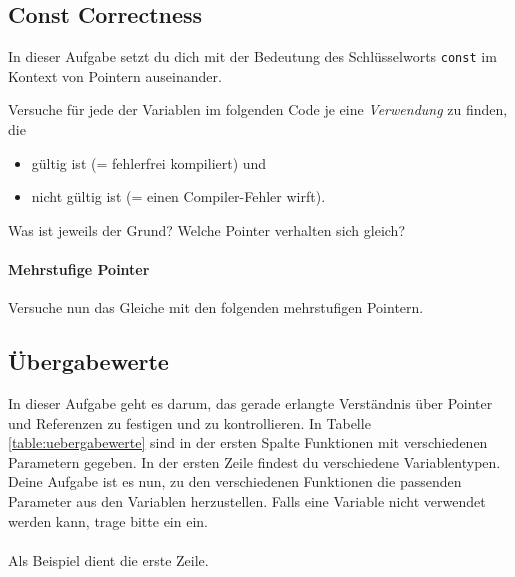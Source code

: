 \subsection{Const Correctness}

In dieser Aufgabe setzt du dich mit der Bedeutung des Schlüsselworts \lstinline{const} im Kontext von Pointern auseinander.

Versuche für jede der Variablen im folgenden Code je eine \emph{Verwendung} zu finden, die  
\begin{itemize}
\item gültig ist (= fehlerfrei kompiliert) und
\item nicht gültig ist (= einen Compiler-Fehler wirft).
\end{itemize}


Was ist jeweils der Grund?
Welche Pointer verhalten sich gleich?


\paragraph{Mehrstufige Pointer}

Versuche nun das Gleiche mit den folgenden mehrstufigen Pointern.


\subsection{Übergabewerte}
In dieser Aufgabe geht es darum, das gerade erlangte Verständnis über Pointer und Referenzen zu festigen und zu kontrollieren.
In Tabelle \ref{table:uebergabewerte} sind in der ersten Spalte Funktionen mit verschiedenen Parametern gegeben.
In der ersten Zeile findest du verschiedene Variablentypen.
Deine Aufgabe ist es nun, zu den verschiedenen Funktionen die passenden Parameter aus den Variablen herzustellen.
Falls eine Variable nicht verwendet werden kann, trage bitte ein \xmark ein. \\\\
Als Beispiel dient die erste Zeile. 

